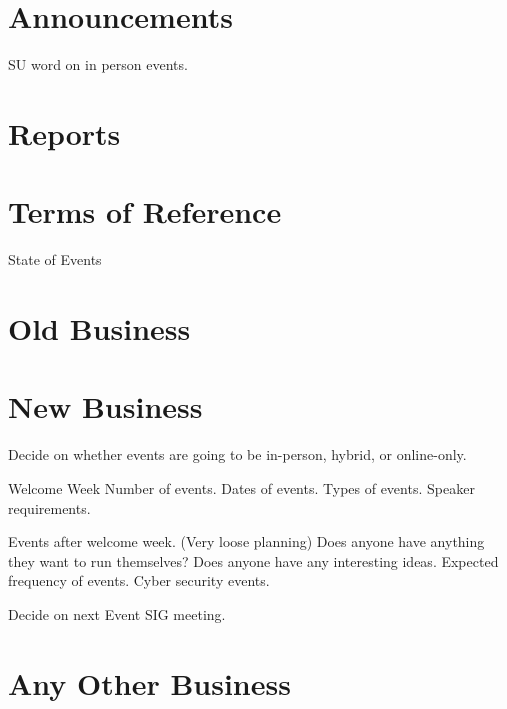 \documentclass[11pt,hacksoc,agenda]{meetingmins}
\begin{document}
\maketitle

\section{Announcements}
\begin{items}
  \item {SU word on in person events.}
\end{items}

\section{Reports}

\section{Terms of Reference}
\begin{items}
  \item {State of Events}
\end{items}

\section{Old Business}

\section{New Business}
\begin{items}
  \item {Decide on whether events are going to be in-person, hybrid, or online-only.}
  \item {Welcome Week}
  \subitem Number of events.
  \subitem Dates of events.
  \subitem Types of events.
  \subitem Speaker requirements.

  \item {Events after welcome week. (Very loose planning)}
  \subitem Does anyone have anything they want to run themselves?
  \subitem Does anyone have any interesting ideas.
  \subitem Expected frequency of events.
  \subitem Cyber security events.

  \item {Decide on next Event SIG meeting.}

\end{items}

\section{Any Other Business}

\vspace{1em}
\end{document}
